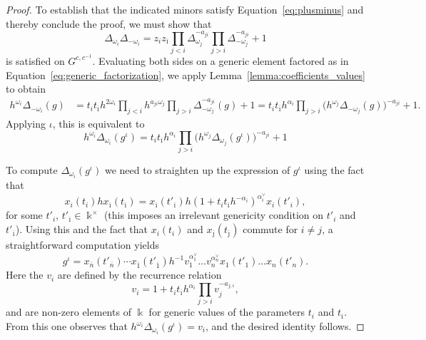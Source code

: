\documentclass[12pt]{amsart}
\newcommand{\kk}{\Bbbk}
\newcommand{\ol}[1]{\overline{#1}}
\newcommand{\cvar}{z}
\theoremstyle{remark}
\numberwithin{equation}{section}
\numberwithin{figure}{section}
\begin{document}
\begin{proof}
  To establish that the indicated minors satisfy Equation~\eqref{eq:plusminus} and thereby conclude the proof, we must show that
  \begin{equation*}
    \Delta_{\omega_i}\Delta_{-\omega_i}
    =
    \cvar_i \cvar_{\ol{\imath}}
    \prod_{j<i}\Delta_{\omega_j}^{-a_{ji}}
    \prod_{j>i}\Delta_{-\omega_j}^{-a_{ji}}
    +
    1
  \end{equation*}
  is satisfied on $G^{c,c^{-1}}$.
  Evaluating both sides on a generic element factored as in Equation~\eqref{eq:generic_factorization}, we apply Lemma~\ref{lemma:coefficients_values} to obtain
  \begin{align*}
    h^{\omega_i}\Delta_{-\omega_i}(g)
    &=
    t_i
    t_{\ol{\imath}}
    h^{2\omega_i}
    \prod_{j<i}h^{a_{j i}\omega_j}
    \prod_{j>i}\Delta_{-\omega_j}^{-a_{ji}}(g)
    +
    1
    =
    t_i
    t_{\ol{\imath}}
    h^{\alpha_i}
    \prod_{j>i}\Big(h^{\omega_j}\Delta_{-\omega_j}(g)\Big)^{-a_{ji}}
    +
    1.
  \end{align*}
  Applying $\iota$, this is equivalent to
  \begin{equation*}
    h^{\omega_i}\Delta_{\omega_i}(g^\iota) =
    t_i
    t_{\ol{\imath}}
    h^{\alpha_i}
    \prod_{j>i}\Big(h^{\omega_j}\Delta_{\omega_j}(g^\iota)\Big)^{-a_{ji}}
    +
    1
  \end{equation*}

  To compute $\Delta_{\omega_i}(g^\iota)$ we need to straighten up the expression of $g^\iota$ using the fact that
  \begin{equation*}
    x_i(t_i) h x_{\ol{\imath}}(t_{\ol{\imath}})
    =
    x_{\ol{\imath}}(t'_{\ol{\imath}})
    h
    (1+t_it_{\ol{\imath}}h^{-\alpha_i})^{\alpha_i^\vee}
    x_{i}(t'_i),
  \end{equation*}
  for some $t'_i$, $t'_{\ol{\imath}} \in \kk^\times$ \cite[Proposition 7.2]{BZ01} (this imposes an irrelevant genericity condition on $t'_i$ and $t'_{\ol{\imath}}$).
  Using this and the fact that $x_i(t_i)$ and $x_{\ol{\jmath}}(t_{\ol{\jmath}})$ commute for $i \neq j$, a straightforward computation yields
  \[
    g^\iota
    =
    x_{\ol{n}}(t'_{\ol{n}})
    \cdots
    x_{\ol{1}}(t'_{\ol{1}})
    h^{-1}
    v_1^{\alpha^\vee_1}
    \dots
    v_n^{\alpha^\vee_n}
    x_1(t'_1)
    \dots
    x_n(t'_n).
  \]
  Here the $v_i$ are defined by the recurrence relation
  \[
    v_i
    =
    1 + t_i t_{\ol{\imath}} h^{\alpha_i}
    \prod_{j > i} v_j^{-a_{j,i}},
  \]
  and are non-zero elements of $\kk$ for generic values of the parameters $t_i$ and $t_{\ol{\imath}}$.
  From this one observes that $h^{\omega_i}\Delta_{\omega_i}(g^\iota) = v_i$, and the desired identity follows.
\end{proof}
\end{document}
